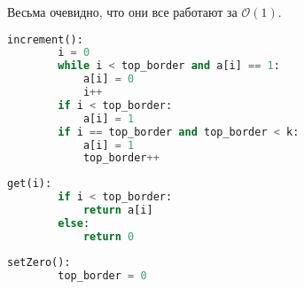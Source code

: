 	Весьма очевидно, что они все работают за $\mathcal{O}(1)$.
	\newpage
	\begin{lstlisting}[language=Python]
	increment():
		i = 0
		while i < top_border and a[i] == 1:
			a[i] = 0
			i++
		if i < top_border:
			a[i] = 1
		if i == top_border and top_border < k:
			a[i] = 1
			top_border++
	\end{lstlisting}
	
	\begin{lstlisting}[language=Python]
	get(i):
		if i < top_border:
			return a[i]
		else:
			return 0
	\end{lstlisting}
	
	\begin{lstlisting}[language=Python]
	setZero():
		top_border = 0
	\end{lstlisting}
	
	
